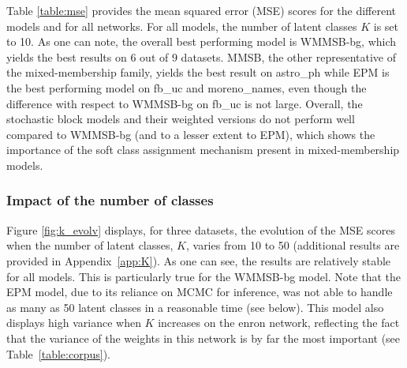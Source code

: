 Table \ref{table:mse} provides the mean squared error (MSE) scores for the different models and for all networks. For all models, the number of latent classes $K$ is set to 10.
As one can note, the overall best performing model is WMMSB-bg, which yields the best results on 6 out of 9 datasets. MMSB, the other representative of the mixed-membership family, yields the best result on astro\_ph while EPM is the best performing model on fb\_uc and moreno\_names, even though the difference with respect to WMMSB-bg on fb\_uc is not large. Overall, the stochastic block models and their weighted versions do not perform well compared to WMMSB-bg (and to a lesser extent to EPM), which shows the importance of the soft class assignment mechanism present in mixed-membership models. 


\subsubsection{Impact of the number of classes} 

Figure \ref{fig:k_evolv} displays, for three datasets, the evolution of the MSE scores when the number of latent classes, $K$, varies from 10 to 50  (additional results are provided in Appendix~\ref{app:K}). As one can see, the results are relatively stable for all models. This is particularly true for the WMMSB-bg model. Note that the EPM model, due to its reliance on MCMC for inference, was not able to handle as many as 50 latent classes in a reasonable time (see below). This model also displays high variance when $K$ increases on the enron network, reflecting the fact that the variance of the weights in this network is by far the most important (see Table~\ref{table:corpus}).

\begin{table*}[t]
\centering
	
\label{table:time}
\end{table*}

